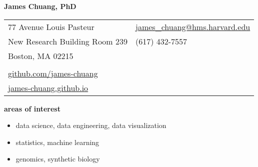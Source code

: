 \documentclass[11pt, a4paper]{article}
\begin{document}
\textbf{\LARGE James Chuang, PhD}

\vspace{0.6cm}

\begin{tabularx}{13 cm}{@{}Xl}
    77 Avenue Louis Pasteur & \href{mailto:james_chuang@hms.harvard.edu}{james\_chuang@hms.harvard.edu} \\
    New Research Building Room 239 & (617) 432-7557                                                     \\
    Boston, MA 02215        &                                                                           \\
    \\
    \href{https://github.com/james-chuang}{github.com/james-chuang} \\
    \href{https://james-chuang.github.io}{james-chuang.github.io} \\
\end{tabularx}

\vspace{1.5em}
\noindent\hrulefill
\vspace{1.5em}

\textbf{\Large areas of interest}
\begin{itemize}[topsep=0em, align=right, leftmargin=!]
    \item data science, data engineering, data visualization
    \item statistics, machine learning
    \item genomics, synthetic biology
\end{itemize}
\end{document}
